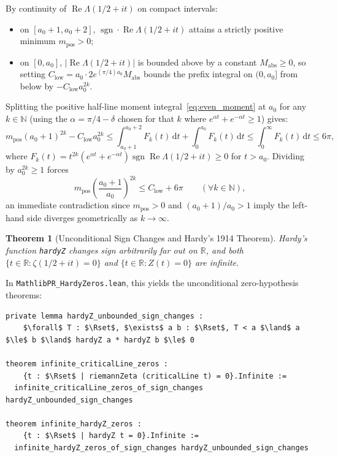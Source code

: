 \documentclass[11pt,a4paper]{article}
\newtheorem{theorem}{Theorem}[section]
\theoremstyle{definition}
\newcommand{\dee}{\mathrm{d}}
\newcommand{\Nset}{\mathbb{N}}
\newcommand{\Rset}{\mathbb{R}}
\begin{document}
By continuity of $\operatorname{Re}\Lambda(1/2+it)$ on compact intervals:
\begin{itemize}[noitemsep]
\item on $[a_0 + 1, a_0 + 2]$, $\operatorname{sgn} \cdot \operatorname{Re}\Lambda(1/2 + it)$ attains a strictly positive minimum $m_{\text{pos}} > 0$;
\item on $[0, a_0]$, $|\operatorname{Re}\Lambda(1/2 + it)|$ is bounded above by a constant $M_{\text{abs}} \ge 0$, so setting $C_{\text{low}} = a_0 \cdot 2 e^{(\pi/4)a_0} M_{\text{abs}}$ bounds the prefix integral on $(0, a_0]$ from below by $-C_{\text{low}} a_0^{2k}$.
\end{itemize}
Splitting the positive half-line moment integral~\eqref{eq:even_moment} at $a_0$ for any $k \in \Nset$ (using the $\alpha = \pi/4 - \delta$ chosen for that $k$ where $e^{\alpha t} + e^{-\alpha t} \ge 1$) gives:
\begin{equation}
m_{\text{pos}} (a_0 + 1)^{2k} - C_{\text{low}} a_0^{2k}
\le \int_{a_0+1}^{a_0+2} F_k(t)\,\dee t + \int_0^{a_0} F_k(t)\,\dee t
\le \int_0^\infty F_k(t)\,\dee t \le 6\pi,
\end{equation}
where $F_k(t) = t^{2k}(e^{\alpha t} + e^{-\alpha t})\operatorname{sgn}\operatorname{Re}\Lambda(1/2+it) \ge 0$ for $t > a_0$. Dividing by $a_0^{2k} \ge 1$ forces
\begin{equation}
m_{\text{pos}} \left(\frac{a_0 + 1}{a_0}\right)^{2k} \le C_{\text{low}} + 6\pi \qquad (\forall k \in \Nset),
\end{equation}
an immediate contradiction since $m_{\text{pos}} > 0$ and $(a_0+1)/a_0 > 1$ imply the left-hand side diverges geometrically as $k \to \infty$.

\begin{theorem}[Unconditional Sign Changes and Hardy's 1914 Theorem]\label{thm:hardy_unconditional}
Hardy's function \texttt{hardyZ} changes sign arbitrarily far out on $\Rset$, and both $\{t \in \Rset : \zeta(1/2 + it) = 0\}$ and $\{t \in \Rset : Z(t) = 0\}$ are infinite.
\end{theorem}

In \texttt{MathlibPR\_\allowbreak HardyZeros.lean}, this yields the unconditional zero-hypothesis theorems:
\begin{lstlisting}
private lemma hardyZ_unbounded_sign_changes :
    $\forall$ T : $\Rset$, $\exists$ a b : $\Rset$, T < a $\land$ a $\le$ b $\land$ hardyZ a * hardyZ b $\le$ 0

theorem infinite_criticalLine_zeros :
    {t : $\Rset$ | riemannZeta (criticalLine t) = 0}.Infinite :=
  infinite_criticalLine_zeros_of_sign_changes hardyZ_unbounded_sign_changes

theorem infinite_hardyZ_zeros :
    {t : $\Rset$ | hardyZ t = 0}.Infinite :=
  infinite_hardyZ_zeros_of_sign_changes hardyZ_unbounded_sign_changes
\end{lstlisting}
\end{document}
